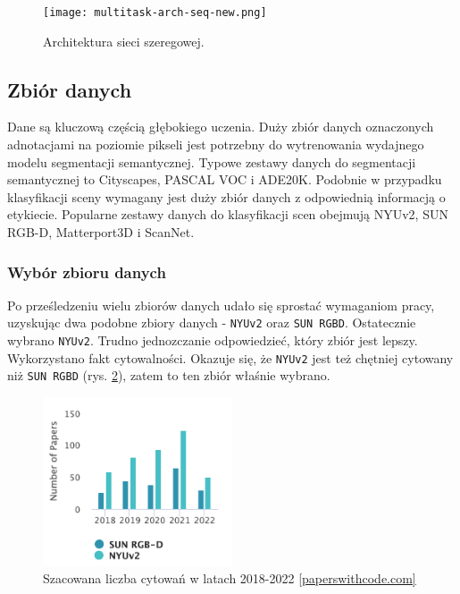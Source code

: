 \begin{figure}[ht!]
    \centering
    \texttt{[image: multitask-arch-seq-new.png]}
    \caption{Architektura sieci szeregowej.}
    \label{fig:multitask-seq}
\end{figure}



\subsection{Zbiór  danych}
Dane są kluczową częścią głębokiego uczenia. Duży zbiór danych oznaczonych adnotacjami na poziomie pikseli jest potrzebny do wytrenowania wydajnego modelu segmentacji semantycznej. Typowe zestawy danych do segmentacji semantycznej to Cityscapes, PASCAL VOC i ADE20K. Podobnie w przypadku klasyfikacji sceny wymagany jest duży zbiór danych z odpowiednią informacją o etykiecie. Popularne zestawy danych do klasyfikacji scen obejmują NYUv2, SUN RGB-D, Matterport3D i ScanNet.
\subsubsection{Wybór zbioru danych}
Po prześledzeniu wielu zbiorów danych udało się sprostać wymaganiom pracy, uzyskując dwa podobne zbiory danych - \texttt{NYUv2} oraz \texttt{SUN RGBD}. Ostatecznie wybrano \texttt{NYUv2}. Trudno jednozczanie odpowiedzieć, który zbiór jest lepszy. Wykorzystano fakt cytowalności. Okazuje się, że \texttt{NYUv2} jest też chętniej cytowany niż \texttt{SUN RGBD} (rys. \ref{fig:sun-vs-nyu}), zatem to ten zbiór właśnie wybrano.

\begin{figure}[ht!]
    \centering
    \includegraphics[width=0.5\textwidth]{img/stats-dataset.png}
    \caption[]{Szacowana liczba cytowań w latach 2018-2022 \href{https://paperswithcode.com/dataset/sun-rgb-d}{[paperswithcode.com]}}
    \label{fig:sun-vs-nyu}
\end{figure}
